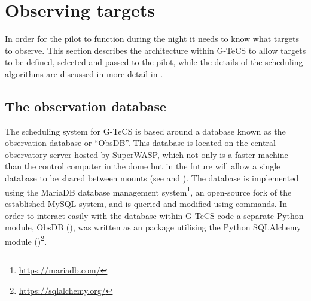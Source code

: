 \section{Observing targets}
\label{sec:observing}
\begin{colsection}


\begin{colsection}

In order for the pilot to function during the night it needs to know what targets to observe. This section describes the architecture within G-TeCS to allow targets to be defined, selected and passed to the pilot, while the details of the scheduling algorithms are discussed in more detail in .

\end{colsection}

\subsection{The observation database}
\label{sec:obsdb}
\begin{colsection}

The scheduling system for G-TeCS is based around a database known as the observation database or ``ObsDB''. This database is located on the central observatory server hosted by SuperWASP, which not only is a faster machine than the control computer in the dome but in the future will allow a single database to be shared between mounts (see  and ). The database is implemented using the MariaDB database management system\footnote{\url{https://mariadb.com/}}, an open-source fork of the established MySQL system, and is queried and modified using  commands. In order to interact easily with the database within G-TeCS code a separate Python module, ObsDB (), was written as an  package utilising the Python SQLAlchemy module ()\footnote{\url{https://sqlalchemy.org/}}.


\end{colsection}
\end{colsection}
